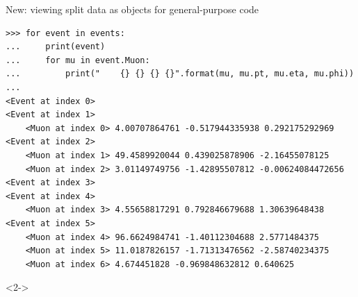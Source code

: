 \documentclass[aspectratio=169]{beamer}
\begin{document}
\begin{frame}[fragile]{New: viewing split data as objects for general-purpose code}
\vspace{0.1 cm}
\small
\begin{verbatim}
>>> for event in events:
...     print(event)
...     for mu in event.Muon:
...         print("    {} {} {} {}".format(mu, mu.pt, mu.eta, mu.phi))
...
<Event at index 0>
<Event at index 1>
    <Muon at index 0> 4.00707864761 -0.517944335938 0.292175292969
<Event at index 2>
    <Muon at index 1> 49.4589920044 0.439025878906 -2.16455078125
    <Muon at index 2> 3.01149749756 -1.42895507812 -0.00624084472656
<Event at index 3>
<Event at index 4>
    <Muon at index 3> 4.55658817291 0.792846679688 1.30639648438
<Event at index 5>
    <Muon at index 4> 96.6624984741 -1.40112304688 2.5771484375
    <Muon at index 5> 11.0187826157 -1.71313476562 -2.58740234375
    <Muon at index 6> 4.674451828 -0.969848632812 0.640625
\end{verbatim}

\vspace{-5.5 cm}
\begin{uncoverenv}<2->
\begin{center}
\end{center}
\end{uncoverenv}
\vspace{5.5 cm}

\vspace{-10.6 cm}
\hfill {}
\vspace{10.6 cm}
\end{frame}
\end{document}
